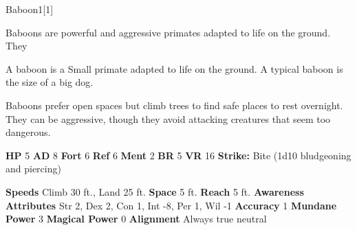   \begin{monsection}{Baboon}{1}[1]
    \vspace{-1em}\vspace{-1em}
    \vspace{0em}

    
      Baboons are powerful and aggressive primates adapted to life on the ground.
      They
    
        A baboon is a Small primate adapted to life on the ground.
        A typical baboon is the size of a big dog.
      
        Baboons prefer open spaces but climb trees to find safe places to rest overnight.
        They can be aggressive, though they avoid attacking creatures that seem too dangerous.
      

    \begin{spellcontent}
      \begin{spelltargetinginfo}
        \pari \textbf{HP} 5 \monsep
          \textbf{AD} 8 \monsep
          \textbf{Fort} 6 \monsep
          \textbf{Ref} 6 \monsep
          \textbf{Ment} 2
        \pari \textbf{BR} 5 \monsep
        \textbf{VR} 16
        \pari \textbf{Strike:}
            Bite  (1d10 bludgeoning and piercing)
      \end{spelltargetinginfo}
    \end{spellcontent}
    \begin{monsterfooter}
      \pari \textbf{Speeds} Climb 30 ft., Land 25 ft. \monsep
        \textbf{Space} 5 ft. \monsep
        \textbf{Reach} 5 ft.
      \pari \textbf{Awareness} 
      \pari \textbf{Attributes}
        Str 2, Dex 2,
        Con 1, Int -8,
        Per 1, Wil -1
      \pari \textbf{Accuracy} 1 \monsep
        \textbf{Mundane Power} 3 \monsep
      \textbf{Magical Power} 0
      \pari \textbf{Alignment} Always true neutral
    \end{monsterfooter}
  \end{monsection}
  
